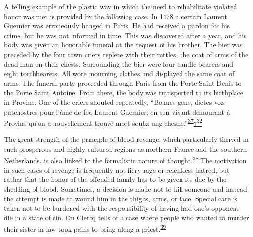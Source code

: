 A telling example of the plastic way in which the need to rehabilitate
violated honor was met is provided by the following case. In 1478 a
certain Laurent Guernier was erroneously hanged in Paris. He had
received a pardon for his crime, but he was not informed in time. This
was discovered after a year, and his body was given an honorable funeral
at the request of his brother. The bier was preceded by the four town
criers replete with their rattles, the coat of arms of the dead man on
their chests. Surrounding the bier were four candle bearers and eight
torchbearers. All wore mourning clothes and displayed the same coat of
arms. The funeral party proceeded through Paris from the Porte Saint
Denis to the Porte Saint Antoine. From there, the body was transported
to its birthplace in Provins. One of the criers shouted repeatedly,
``Bonnes gens, dictes voz patenostres pour l'âme de feu Laurent
Guernier, en son vivant demourant à Provins qu'on a nouvellement trouvé
mort soubz ung
chesne.''\textsuperscript{\protect\hypertarget{18_Chapter_Eleven__THE_FORMS_OF_THO.xhtmlux5cux23id_559}{\protect\hyperlink{23_NOTES.xhtmlux5cux23id_560}{37}}}\protect\hypertarget{18_Chapter_Eleven__THE_FORMS_OF_THO.xhtmlux5cux23id_2627}{\protect\hyperlink{23_NOTES.xhtmlux5cux23id_2628}{†\textsuperscript{32}}}

The great strength of the principle of blood revenge, which particularly
thrived in such prosperous and highly cultured regions as northern
France and the southern Netherlands, is also linked to the formalistic
nature of
thought.\textsuperscript{\protect\hypertarget{18_Chapter_Eleven__THE_FORMS_OF_THO.xhtmlux5cux23id_557}{\protect\hyperlink{23_NOTES.xhtmlux5cux23id_558}{38}}}
The motivation in such cases of revenge is frequently not fiery rage or
relentless hatred, but rather that the honor of the offended family has
to be given its due by the shedding of blood. Sometimes, a decision is
made not to kill someone and instead the attempt is made to wound him in
the thighs, arms, or face. Special care is taken not to be burdened with
the responsibility of having had one's opponent die in a state of sin.
Du Clercq tells of a case where people who wanted to murder their
sister-in-law took pains to bring along a
priest.\textsuperscript{\protect\hypertarget{18_Chapter_Eleven__THE_FORMS_OF_THO.xhtmlux5cux23id_555}{\protect\hyperlink{23_NOTES.xhtmlux5cux23id_556}{39}}}


